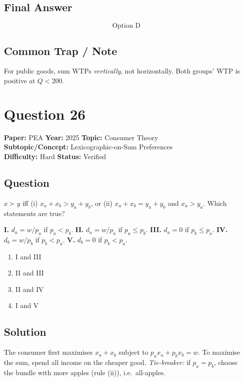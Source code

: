 \documentclass[11pt]{article}
\begin{document}
\subsection*{Final Answer}
\[
\boxed{\text{Option D}}
\]

\subsection*{Common Trap / Note}
For public goods, sum WTPs \emph{vertically}, not horizontally. Both groups' WTP is positive at $Q < 200$.

\section*{Question 26}
\textbf{Paper:} PEA \quad \textbf{Year:} 2025 \quad \textbf{Topic:} Consumer Theory \\
\textbf{Subtopic/Concept:} Lexicographic-on-Sum Preferences \\
\textbf{Difficulty:} Hard \quad \textbf{Status:} Verified

\subsection*{Question}
$x \succ y$ iff (i) $x_a + x_b > y_a + y_b$, or (ii) $x_a + x_b = y_a + y_b$ and $x_a > y_a$. Which statements are true?

\textbf{I.} $d_a = w/p_a$ if $p_a < p_b$. \quad
\textbf{II.} $d_a = w/p_a$ if $p_a \le p_b$. \quad
\textbf{III.} $d_a = 0$ if $p_b \le p_a$. \quad
\textbf{IV.} $d_b = w/p_b$ if $p_b < p_a$. \quad
\textbf{V.} $d_b = 0$ if $p_b < p_a$.

\begin{enumerate}[label=(\Alph*)]
\item I and III \item II and III \item II and IV \item I and V
\end{enumerate}

\subsection*{Solution}
The consumer first maximises $x_a + x_b$ subject to $p_a x_a + p_b x_b = w$. To maximise the sum, spend all income on the cheaper good. \emph{Tie-breaker:} if $p_a = p_b$, choose the bundle with more apples (rule (ii)), i.e.\ all-apples.
\end{document}
